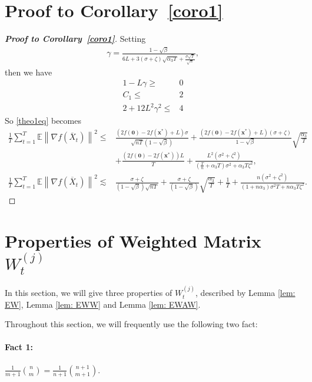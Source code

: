 \section{Proof to Corollary~\ref{coro1}}
\begin{proof} [\textbf{Proof to Corollary~\ref{coro1}}]
Setting 
\begin{align*}
\gamma = \frac{1-\sqrt{\beta}}{6L + 3(\sigma+\zeta)\sqrt{\alpha_3 T} + \frac{\sigma\sqrt{T}}{\sqrt{n}}},
\end{align*}
then we have
\begin{align*}
1-L\gamma \geq & 0\\
C_1 \leq & 2\\
2 + 12 L^2\gamma^2 \leq & 4
\end{align*}
So \eqref{theo1eq} becomes
\begin{align*}
\frac{1}{T}\sum_{t=1}^T\mathbb{E}\left\|\nabla f(\overline{X}_{t})\right\|^2 
\leq & \frac{(2f(\bm{0}) -2f(\bm{x}^*) + L)\sigma}{\sqrt{nT}(1-\sqrt{\beta})} + \frac{(2f(\bm{0}) -2f(\bm{x}^*) + L)(\sigma+\zeta)}{1-\sqrt{\beta}}\sqrt{\frac{\alpha_3}{T}}\\
& + \frac{(2f(\bm{0}) -2f(\bm{x}^*))L}{T} + \frac{L^2(\sigma^2 + \zeta^2)}{(\frac{T}{n} + \alpha_3 T )\sigma^2 + \alpha_3 T \zeta^2},\\
\frac{1}{T}\sum_{t=1}^T\mathbb{E}\left\|\nabla f(\overline{X}_{t})\right\|^2 
\lesssim & \frac{\sigma + \zeta}{(1-\sqrt{\beta})\sqrt{nT}} + \frac{\sigma + \zeta}{(1-\sqrt{\beta})}\sqrt{\frac{\alpha_3}{T}}
 + \frac{1}{T} + \frac{n(\sigma^2 + \zeta^2)}{(1 + n\alpha_3  )\sigma^2 T + n\alpha_3 T \zeta^2}.
\end{align*}

\end{proof}

\section{Properties of Weighted Matrix $W_t^{(j)}$}\label{secD}
In this section, we will give three properties of $W_t^{(j)}$, described by Lemma \ref{lem: EW}, Lemma \ref{lem: EWW} and Lemma \ref{lem: EWAW}.

Throughout this section, we will frequently use the following two fact:
\paragraph{Fact 1:} $\frac{1}{m+1}\binom{n}{m} = \frac{1}{n+1}\binom{n+1}{m+1}$.
